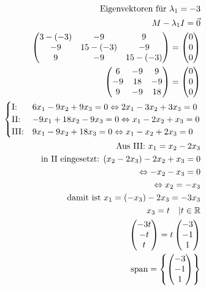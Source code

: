 \begin{align*}
\text{Eigenvektoren für } \lambda_1 = -3 \\
M - \lambda_1 I = \vec{0} \\
\begin{pmatrix}
    3 - (-3) & -9 & 9 \\ -9 & 15 - (-3) & -9 \\ 9 & -9 & 15 - (-3)
\end{pmatrix} = \begin{pmatrix} 0 \\ 0 \\ 0 \end{pmatrix} \\
\begin{pmatrix}
    6 & -9 & 9 \\ -9 & 18 & -9 \\ 9 & -9 & 18
\end{pmatrix} = \begin{pmatrix} 0 \\ 0 \\ 0 \end{pmatrix} \\
\begin{cases}
    \text{I:\@} & 6x_1 - 9x_2 + 9x_3 = 0 \Leftrightarrow 2x_1 - 3x_2 + 3x_3 = 0 \\
    \text{II:\@} & -9x_1 + 18x_2 - 9x_3 = 0 \Leftrightarrow x_1 - 2x_2 + x_3 = 0 \\
    \text{III:\@} & 9x_1 - 9x_2 + 18x_3 = 0 \Leftrightarrow x_1 - x_2 + 2x_3 = 0
\end{cases} \\
\text{Aus III: } x_1 = x_2 - 2x_3 \\
\text{in II eingesetzt: } (x_2 - 2x_3) - 2x_2 + x_3 = 0 \\
\Leftrightarrow -x_2 - x_3 = 0 \\
\Leftrightarrow x_2 = -x_3 \\
\text{damit ist } x_1 = (-x_3) - 2x_3 = -3x_3 \\
x_3 = t \quad | t \in \mathbb{R} \\
\begin{pmatrix} -3t \\ -t \\ t \end{pmatrix} = t \begin{pmatrix} -3 \\ -1 \\ 1 \end{pmatrix} \\
\text{span} = \left\{\begin{pmatrix} -3 \\ -1 \\ 1 \end{pmatrix}\right\} \\\\

\end{align*}
